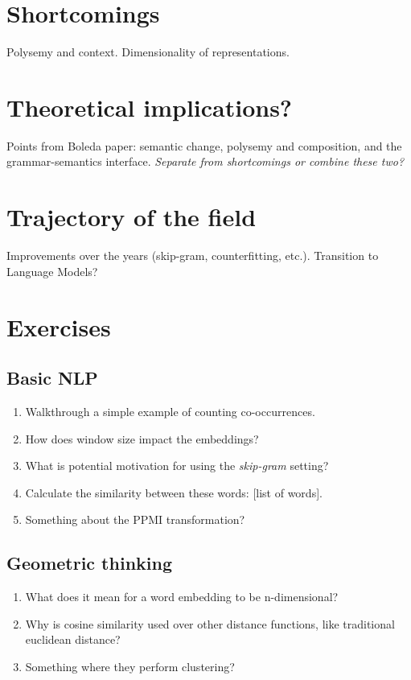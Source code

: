 \section{Shortcomings}
Polysemy and context.
Dimensionality of representations.

\section{Theoretical implications?}
Points from Boleda paper: semantic change, polysemy and composition, and the grammar-semantics interface.
\textit{Separate from shortcomings or combine these two?}

\section{Trajectory of the field}
Improvements over the years (skip-gram, counterfitting, etc.).
Transition to Language Models?

\section{Exercises}

\subsection{Basic NLP}

\begin{enumerate}
\item Walkthrough a simple example of counting co-occurrences.
\item How does window size impact the embeddings?
\item What is potential motivation for using the \textit{skip-gram} setting?
\item Calculate the similarity between these words: [list of words]. 
\item Something about the PPMI transformation?
\end{enumerate}

\subsection{Geometric thinking}

\begin{enumerate}
\item What does it mean for a word embedding to be n-dimensional?
\item Why is cosine similarity used over other distance functions, like traditional euclidean distance?
\item Something where they perform clustering?
\end{enumerate}

